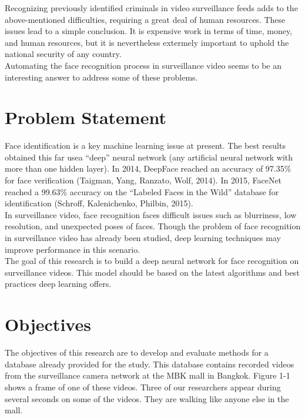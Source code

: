 Recognizing previously identified criminals in video surveillance feeds adds to the above-mentioned difficulties, requiring a great deal of human resources. These issues lead to a simple conclusion.  It is expensive work in terms of time, money, and human resources, but it is nevertheless extermely important to uphold the national security of any country.\\

Automating the face recognition process in surveillance video seems to be an interesting answer to address some of these problems.\\


\section{Problem Statement}

 Face identification is a key machine learning issue at present. The best results obtained this far usea \enquote{deep} neural network (any artificial neural network with more than one hidden layer). In 2014, DeepFace reached an accuracy of 97.35\% for face verification (Taigman, Yang, Ranzato, Wolf, 2014). In 2015, FaceNet reached a 99.63\% accuracy on the \enquote{Labeled Faces in the Wild} database for identification (Schroff, Kalenichenko, Philbin, 2015).\\


In surveillance video, face recognition faces difficult issues such as blurriness, low resolution, and unexpected poses of faces. Though the problem of face recognition in surveillance video has already been studied, deep learning techniques may improve performance in this scenario.\\

The goal of this research is to build a deep neural network for face recognition on surveillance videos. This model should be based on the latest algorithms and best practices deep learning offers.

\section{Objectives}

The objectives of this research are to develop and evaluate methods for a database already provided for the study. This database contains recorded videos from the surveillance camera network at the MBK mall in Bangkok. Figure 1-1 shows a frame of one of these videos. Three of our researchers appear during several seconds on some of the videos. They are walking like anyone else in the mall.\\

